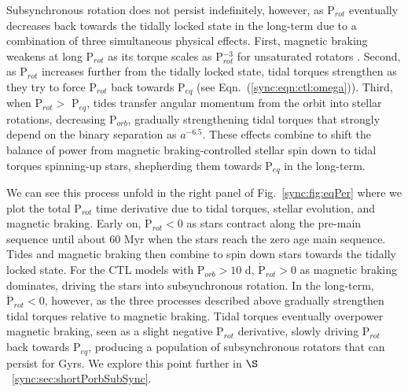 Subsynchronous rotation does not persist indefinitely, however, as P$_{rot}$ eventually decreases back towards the tidally locked state in the long-term due to a combination of three simultaneous physical effects.  First, magnetic braking weakens at long P$_{rot}$ as its torque scales as P$_{rot}^{-3}$ for unsaturated rotators \citep{Matt2015}. Second, as P$_{rot}$ increases further from the tidally locked state, tidal torques strengthen as they try to force P$_{rot}$ back towards P$_{eq}$ (see Eqn.~(\ref{sync:eqn:ctl:omega})). Third, when P$_{rot} > $ P$_{eq}$, tides transfer angular momentum from the orbit into stellar rotations, decreasing P$_{orb}$, gradually strengthening tidal torques that strongly depend on the binary separation as $a^{-6.5}$.  These effects combine to shift the balance of power from magnetic braking-controlled stellar spin down to tidal torques spinning-up stars, shepherding them towards P$_{eq}$ in the long-term. 

We can see this process unfold in the right panel of Fig.~\ref{sync:fig:eqPer} where we plot the total P$_{rot}$ time derivative due to tidal torques, stellar evolution, and magnetic braking. Early on, $\dot{\mathrm{P}}_{rot} < 0$ as stars contract along the pre-main sequence until about 60 Myr when the stars reach the zero age main sequence. Tides and magnetic braking then combine to spin down stars towards the tidally locked state. For the CTL models with P$_{orb} > 10$ d, $\dot{\mathrm{P}}_{rot} > 0$ as magnetic braking dominates, driving the stars into subsynchronous rotation. In the long-term, $\ddot{\mathrm{P}}_{rot} < 0$, however, as the three processes described above gradually strengthen tidal torques relative to magnetic braking.  Tidal torques eventually overpower magnetic braking, seen as a slight negative P$_{rot}$ derivative, slowly driving P$_{rot}$ back towards P$_{eq}$, producing a population of subsynchronous rotators that can persist for Gyrs. We explore this point further in $\S$~\ref{sync:sec:shortPorbSubSync}.  


